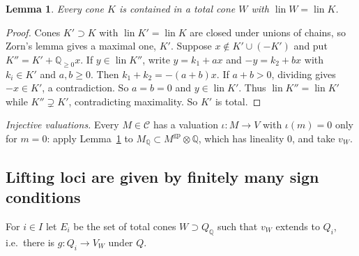 \documentclass[11pt]{article}
\newtheorem{lemma}[theorem]{Lemma}
\theoremstyle{definition}
\theoremstyle{remark}
\newcommand{\QQ}{\mathbb{Q}}
\newcommand{\cC}{\mathcal{C}}
\newcommand{\gp}{\mathrm{gp}}
\newcommand{\lin}{\operatorname{lin}}
\newcommand{\Qrat}{Q_{\QQ}}
\begin{document}
\begin{lemma}\label{lem:Z}
Every cone $K$ is contained in a total cone $W$ with $\lin W=\lin K$.
\end{lemma}
\begin{proof}
Cones $K'\supset K$ with $\lin K'=\lin K$ are closed under unions of chains, so Zorn's lemma gives a maximal one, $K'$. Suppose $x\notin K'\cup(-K')$ and put $K''=K'+\QQ_{\ge0}x$. If $y\in\lin K''$, write $y=k_1+ax$ and $-y=k_2+bx$ with $k_i\in K'$ and $a,b\ge0$. Then $k_1+k_2=-(a+b)x$. If $a+b>0$, dividing gives $-x\in K'$, a contradiction. So $a=b=0$ and $y\in\lin K'$. Thus $\lin K''=\lin K'$ while $K''\supsetneq K'$, contradicting maximality. So $K'$ is total.
\end{proof}

\emph{Injective valuations.} Every $M\in\cC$ has a valuation $\iota\colon M\to V$ with $\iota(m)=0$ only for $m=0$: apply Lemma~\ref{lem:Z} to $M_{\QQ}\subset M^{\gp}\otimes\QQ$, which has lineality $0$, and take $v_W$.

\subsection{Lifting loci are given by finitely many sign conditions}
For $i\in I$ let $E_i$ be the set of total cones $W\supset\Qrat$ such that $v_W$ extends to $Q_i$, i.e.\ there is $g\colon Q_i\to V_W$ under $Q$.
\end{document}
